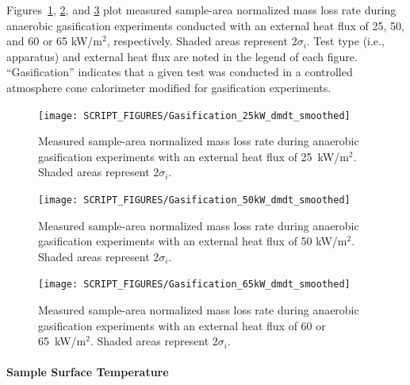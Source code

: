\documentclass{book}
\begin{document}
Figures~\ref{Fig:Gasification_25kW_dmdt}, \ref{Fig:Gasification_50kW_dmdt}, and \ref{Fig:Gasification_65kW_dmdt} plot measured sample-area normalized mass loss rate during anaerobic gasification experiments conducted with an external heat flux of 25, 50, and 60 or 65 kW/m$^2$, respectively. Shaded areas represent $2\sigma_i$. Test type (i.e., apparatus) and external heat flux are noted in the legend of each figure. ``Gasification'' indicates that a given test was conducted in a controlled atmosphere cone calorimeter modified for gasification experiments.

\begin{figure}
  \centering
  \texttt{[image: SCRIPT\_FIGURES/Gasification\_25kW\_dmdt\_smoothed]}
  \caption{Measured sample-area normalized mass loss rate during anaerobic gasification experiments with an external heat flux of 25~kW/m$^2$. Shaded areas represent $2\sigma_i$.}
  \label{Fig:Gasification_25kW_dmdt}
\end{figure}

\begin{figure}
  \centering
  \texttt{[image: SCRIPT\_FIGURES/Gasification\_50kW\_dmdt\_smoothed]}
  \caption{Measured sample-area normalized mass loss rate during anaerobic gasification experiments with an external heat flux of 50 kW/m$^2$. Shaded areas represent $2\sigma_i$.}
  \label{Fig:Gasification_50kW_dmdt}
\end{figure}

\begin{figure}
  \centering
  \texttt{[image: SCRIPT\_FIGURES/Gasification\_65kW\_dmdt\_smoothed]}
  \caption{Measured sample-area normalized mass loss rate during anaerobic gasification experiments with an external heat flux of 60 or 65~kW/m$^2$. Shaded areas represent $2\sigma_i$.}
  \label{Fig:Gasification_65kW_dmdt}
\end{figure}


\paragraph{Sample Surface Temperature}
\end{document}
